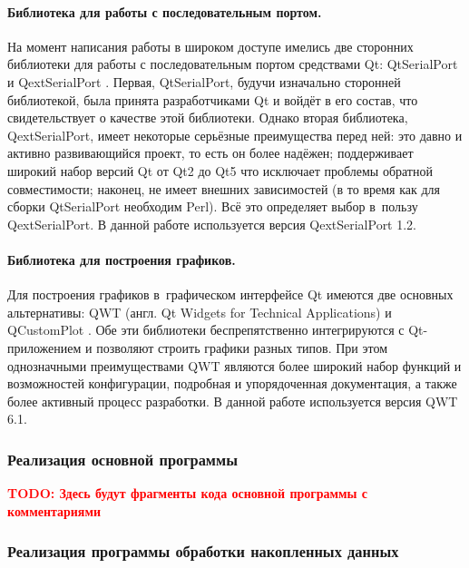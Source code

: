 \documentclass[a4paper, 14pt, titlepage]{extarticle}
\newcommand{\todo}[1]{\textbf{\textcolor{red}{TODO: #1}}}
\newcommand{\eng}[1]{\foreignlanguage{english}{#1}}
\let\oldparagraph\paragraph
\renewcommand{\paragraph}[1]{\oldparagraph{\indent #1}}
\begin{document}
  \paragraph{Библиотека для работы с последовательным портом.}
  На момент написания работы в широком доступе имелись две сторонних библиотеки для работы с
  последовательным портом средствами Qt: QtSerialPort \cite{qtserialport} и QextSerialPort \cite{qextserialport}.
  Первая, QtSerialPort, будучи изначально сторонней библиотекой, была принята разработчиками Qt и
  войдёт в его состав, что свидетельствует о качестве этой библиотеки. Однако вторая
  библиотека, QextSerialPort, имеет некоторые серьёзные преимущества перед ней: это давно и активно
  развивающийся проект, то есть он более надёжен; поддерживает широкий набор версий Qt от Qt2 до Qt5
  что исключает проблемы обратной совместимости; наконец, не имеет внешних зависимостей (в то время
  как для сборки QtSerialPort необходим Perl). Всё это определяет выбор в~пользу QextSerialPort.
  В данной работе используется версия QextSerialPort 1.2.

  \paragraph{Библиотека для построения графиков.}
  Для построения графиков в~графическом интерфейсе Qt имеются две основных альтернативы: QWT (англ.
  \eng{Qt Widgets for Technical Applications}) \cite{qwt} и QCustomPlot \cite{qcustomplot}.  Обе эти
  библиотеки беспрепятственно интегрируются с Qt-приложением и позволяют строить графики разных
  типов. При этом однозначными преимуществами QWT являются более широкий набор функций и
  возможностей конфигурации, подробная и упорядоченная документация, а также более активный процесс разработки.
  В данной работе используется версия QWT 6.1.

  \subsubsection{Реализация основной программы}\label{sssec:main-impl}

  \todo{Здесь будут фрагменты кода основной программы с комментариями}

  \subsubsection{Реализация программы обработки накопленных данных}
  
\end{document}

